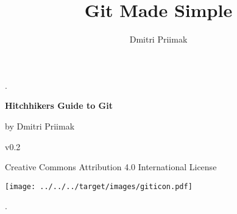 \documentclass{article}
\title{Git Made Simple}
\author{Dmitri Priimak}
\date{}
\theoremstyle{definition}
\begin{document}
       \newcommand{\segment}[1]{$\overline{#1}$}
       \newcommand{\msegment}[1]{\overline{#1}}
       \thispagestyle{empty}
       \begin{center}
           .

       \vspace{4cm}
       {\Huge \textbf{Hitchhikers Guide to Git}}

               \vspace{6mm}
       {\large by Dmitri Priimak

       v0.2
       }


       Creative Commons Attribution 4.0 International License


               \vspace{2cm}

       \texttt{[image: ../../../target/images/giticon.pdf]}
       \end{center}
       \newpage
       \thispagestyle{empty}
       .
       \newpage
       \thispagestyle{empty}
       \tableofcontents
       \newpage
       \cleardoublepage
       \setcounter{page}{1}
\end{document}
